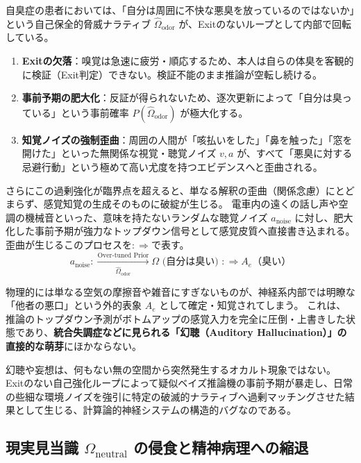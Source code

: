 自臭症の患者においては、「自分は周囲に不快な悪臭を放っているのではないか」という自己保全的脅威ナラティブ $\hat{\Omega}_{\mathrm{odor}}$ が、Exitのないループとして内部で回転している。
\begin{enumerate}[label=(\arabic*)]
  \item \textbf{Exitの欠落}：嗅覚は急速に疲労・順応するため、本人は自らの体臭を客観的に検証（Exit判定）できない。検証不能のまま推論が空転し続ける。
  \item \textbf{事前予期の肥大化}：反証が得られないため、逐次更新によって「自分は臭っている」という事前確率 $P(\hat{\Omega}_{\mathrm{odor}})$ が極大化する。
  \item \textbf{知覚ノイズの強制歪曲}：周囲の人間が「咳払いをした」「鼻を触った」「窓を開けた」といった無関係な視覚・聴覚ノイズ $v, a$ が、すべて「悪臭に対する忌避行動」という極めて高い尤度を持つエビデンスへと歪曲される。
\end{enumerate}

さらにこの過剰強化が臨界点を超えると、単なる解釈の歪曲（関係念慮）にとどまらず、感覚知覚の生成そのものに破綻が生じる。
電車内の遠くの話し声や空調の機械音といった、意味を持たないランダムな聴覚ノイズ $a_{\mathrm{noise}}$ に対し、肥大化した事前予期が強力なトップダウン信号として感覚皮質へ直接書き込まれる。
歪曲が生じるこのプロセスを$:\Longrightarrow$で表す。
\begin{equation}
    a_{\mathrm{noise}} :\xrightarrow[\hat{\Omega}_{\mathrm{odor}}]{\text{Over-tuned Prior}} \Omega \text{ (自分は臭い) } :\Longrightarrow A_e \text{（臭い）}
\end{equation}

物理的には単なる空気の摩擦音や雑音にすぎないものが、神経系内部では明瞭な「他者の悪口」という外的表象 $A_e$ として確定・知覚されてしまう。
これは、推論のトップダウン予測がボトムアップの感覚入力を完全に圧倒・上書きした状態であり、\textbf{統合失調症などに見られる「幻聴（Auditory Hallucination）」の直接的な萌芽}にほかならない。

幻聴や妄想は、何もない無の空間から突然発生するオカルト現象ではない。
Exitのない自己強化ループによって疑似ベイズ推論機の事前予期が暴走し、日常の些細な環境ノイズを強引に特定の破滅的ナラティブへ過剰マッチングさせた結果として生じる、計算論的神経システムの構造的バグなのである。


\subsection{現実見当識 $\Omega_{\mathrm{neutral}}$ の侵食と精神病理への縮退}

